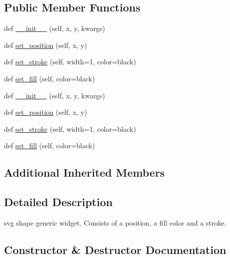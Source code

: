 \subsection*{Public Member Functions}
\begin{DoxyCompactItemize}
\item 
def \hyperlink{classremi_1_1gui_1_1SvgShape_a37f6ec97c58707e9360effdb3c7458f6}{\+\_\+\+\_\+init\+\_\+\+\_\+} (self, x, y, kwargs)
\item 
def \hyperlink{classremi_1_1gui_1_1SvgShape_a15ecf5e4541c94d26100fa8eec3cc5ce}{set\+\_\+position} (self, x, y)
\item 
def \hyperlink{classremi_1_1gui_1_1SvgShape_a1ed1293aab9b1cddf2fa1f8d50d80b3b}{set\+\_\+stroke} (self, width=1, color=\textquotesingle{}black\textquotesingle{})
\item 
def \hyperlink{classremi_1_1gui_1_1SvgShape_a0227ee21eeceeb98b2df926f2d4c88c2}{set\+\_\+fill} (self, color=\textquotesingle{}black\textquotesingle{})
\item 
def \hyperlink{classremi_1_1gui_1_1SvgShape_a37f6ec97c58707e9360effdb3c7458f6}{\+\_\+\+\_\+init\+\_\+\+\_\+} (self, x, y, kwargs)
\item 
def \hyperlink{classremi_1_1gui_1_1SvgShape_a15ecf5e4541c94d26100fa8eec3cc5ce}{set\+\_\+position} (self, x, y)
\item 
def \hyperlink{classremi_1_1gui_1_1SvgShape_a1ed1293aab9b1cddf2fa1f8d50d80b3b}{set\+\_\+stroke} (self, width=1, color=\textquotesingle{}black\textquotesingle{})
\item 
def \hyperlink{classremi_1_1gui_1_1SvgShape_a0227ee21eeceeb98b2df926f2d4c88c2}{set\+\_\+fill} (self, color=\textquotesingle{}black\textquotesingle{})
\end{DoxyCompactItemize}
\subsection*{Additional Inherited Members}


\subsection{Detailed Description}
\begin{DoxyVerb}svg shape generic widget. Consists of a position, a fill color and a stroke.\end{DoxyVerb}
 

\subsection{Constructor \& Destructor Documentation}

